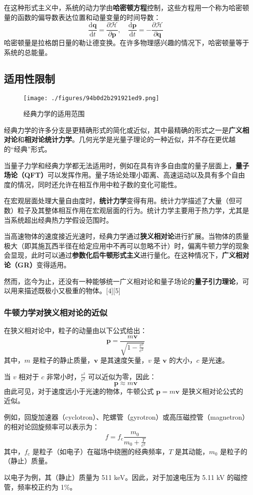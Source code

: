 在这种形式主义中，系统的动力学由\textbf{哈密顿方程}控制，这些方程用一个称为哈密顿量的函数的偏导数表达位置和动量变量的时间导数：  
\[
\frac{\mathrm{d} \boldsymbol{q}}{\mathrm{d} t} = \frac{\partial \mathcal{H}}{\partial \boldsymbol{p}}, \quad \frac{\mathrm{d} \boldsymbol{p}}{\mathrm{d} t} = -\frac{\partial \mathcal{H}}{\partial \boldsymbol{q}}~
\]  
哈密顿量是拉格朗日量的勒让德变换。在许多物理感兴趣的情况下，哈密顿量等于系统的总能量。
\subsection{适用性限制}
\begin{figure}[ht]
\centering
\texttt{[image: ./figures/94b0d2b291921ed9.png]}
\caption{经典力学的适用范围} \label{fig_JDLX_3}
\end{figure}  
经典力学的许多分支是更精确形式的简化或近似，其中最精确的形式之一是\textbf{广义相对论}和\textbf{相对论统计力学}。几何光学是光量子理论的一种近似，并不存在更优越的“经典”形式。  

当量子力学和经典力学都无法适用时，例如在具有许多自由度的量子层面上，\textbf{量子场论（QFT）}可以发挥作用。量子场论处理小距离、高速运动以及具有多个自由度的情况，同时还允许在相互作用中粒子数的变化可能性。  

在宏观层面处理大量自由度时，\textbf{统计力学}变得有用。统计力学描述了大量（但可数）粒子及其整体相互作用在宏观层面的行为。统计力学主要用于热力学，尤其是当系统超出经典热力学假设范围时。  

当高速物体的速度接近光速时，经典力学通过\textbf{狭义相对论}进行扩展。当物体的质量极大（即其施瓦西半径在给定应用中不再可以忽略不计）时，偏离牛顿力学的现象会显现，此时可以通过\textbf{参数化后牛顿形式主义}进行量化。在这种情况下，\textbf{广义相对论（GR）}变得适用。  

然而，迄今为止，还没有一种能够统一广义相对论和量子场论的\textbf{量子引力理论}，可以用来描述既极小又极重的物体。[4][5]
\subsubsection{牛顿力学对狭义相对论的近似} 
在狭义相对论中，粒子的动量由以下公式给出：  
\[
\mathbf{p} = \frac{m\mathbf{v}}{\sqrt{1 - \frac{v^2}{c^2}}}~
\]  
其中，\( m \) 是粒子的静止质量，\( \mathbf{v} \) 是其速度矢量，\( v \) 是 \( \mathbf{v} \) 的大小，\( c \) 是光速。  

当 \( v \) 相对于 \( c \) 非常小时，\( \frac{v^2}{c^2} \) 可以近似为零，因此：  
\[
\mathbf{p} \approx m\mathbf{v}~
\]  
由此可见，对于速度远小于光速的物体，牛顿公式 \( \mathbf{p} = m\mathbf{v} \) 是狭义相对论公式的近似。  

例如，回旋加速器（cyclotron）、陀螺管（gyrotron）或高压磁控管（magnetron）的相对论回旋频率可以表示为：  
\[
f = f_{\mathrm{c}} \frac{m_0}{m_0 + \frac{T}{c^2}}~
\]  
其中，\( f_{\mathrm{c}} \) 是粒子（如电子）在磁场中绕圈的经典频率，\( T \) 是其动能，\( m_0 \) 是粒子的（静止）质量。  

以电子为例，其（静止）质量为 511 keV。因此，对于加速电压为 5.11 kV 的磁控管，频率校正约为 1\%。